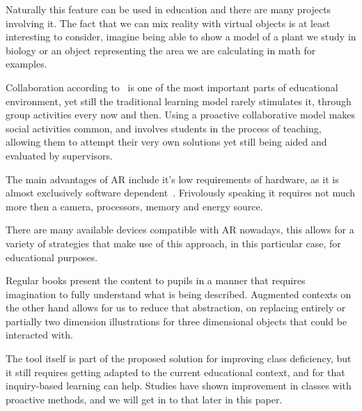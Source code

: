 \documentclass[a4paper,twoside]{article}
\begin{document}
Naturally this feature can be used in education and there are many projects involving it. The fact that we can mix reality with virtual objects is at least interesting to consider, imagine being able to show a model of a plant we study in biology or an object representing the area we are calculating in math for examples. 

Collaboration according to~\cite{kaufmann2003collaborative} is one of the most important parts of educational environment, yet still the traditional learning model rarely stimulates it, through group activities every now and then. Using a proactive collaborative model makes social activities common, and involves students in the process of teaching, allowing them to attempt their very own solutions yet still being aided and evaluated by supervisors.

The main advantages of AR include it's low requirements of hardware, as it is almost exclusively software dependent~\cite{zorzal2006realidade}. Frivolously speaking it requires not much more then a camera, processors, memory and energy source.

There are many available devices compatible with AR nowadays, this allows for a variety of strategies that make use of this approach, in this particular case, for educational purposes. 

Regular books present the content to pupils in a manner that requires imagination to fully understand what is being described. Augmented contexts on the other hand allows for us to reduce that abstraction, on replacing entirely or partially two dimension illustrations for three dimensional objects that could be interacted with.

The tool itself is part of the proposed solution for improving class deficiency, but it still requires getting adapted to the current educational context, and for that inquiry-based learning can help. Studies have shown improvement in classes with proactive methods, and we will get in to that later in this paper.
\end{document}
